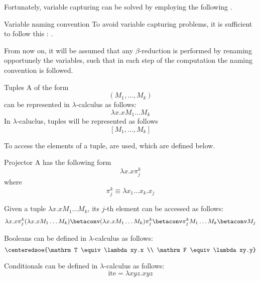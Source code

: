 \documentclass[a4paper, 12pt]{report}
\begin{document}
    Fortunately, variable capturing can be solved by employing the following .

    \begin{frameddefn}{Variable naming convention}
        To avoid variable capturing problems, it is sufficient to follow this : .

        From now on, it will be assumed that any $\beta$-reduction is performed by renaming opportunely the  variables, such that in each step of the computation the naming convention is followed.
    \end{frameddefn}

    \begin{frameddefn}{Tuples}
        A  of the form $$(M_1, \ldots, M_k)$$ can be represented in $\lambda$-calculus as follows: $$\lambda x.xM_1 \ldots M_k$$ In $\lambda$-caluclus, tuples will be represented as follows $$[M_1, \ldots, M_k]$$
    \end{frameddefn}

    To access the elements of a tuple,  are used, which are defined below.

    \begin{frameddefn}{Projector}
        A  has the following form $$\lambda x.x\pi_j^k$$ where $$\pi_j^k \equiv \lambda x_1 \ldots x_k.x_j$$
    \end{frameddefn}

    \begin{example}[Projectors]
        Given a tuple $\lambda x.x M_1 \ldots M_k$, its $j$-th element can be accessed as follows: $$\lambda x.x \pi_j^k (\lambda x.x M_1 \ldots M_k) \betaconv (\lambda x.x M_1 \ldots M_k) \pi_j^k \betaconv \pi_j^k M_1 \ldots M_k \betaconv M_j$$
    \end{example}

    \begin{frameddefn}{Booleans}
         can be defined in $\lambda$-calculus as follows: $$\centeredsoe{\mathrm T \equiv \lambda xy.x \\ \mathrm F \equiv \lambda xy.y}$$
    \end{frameddefn}

    \begin{frameddefn}{Conditionals}
         can be defined in $\lambda$-calculus as follows: $$\mathrm{ite} = \lambda xyz.xyz$$
    \end{frameddefn}
\end{document}
